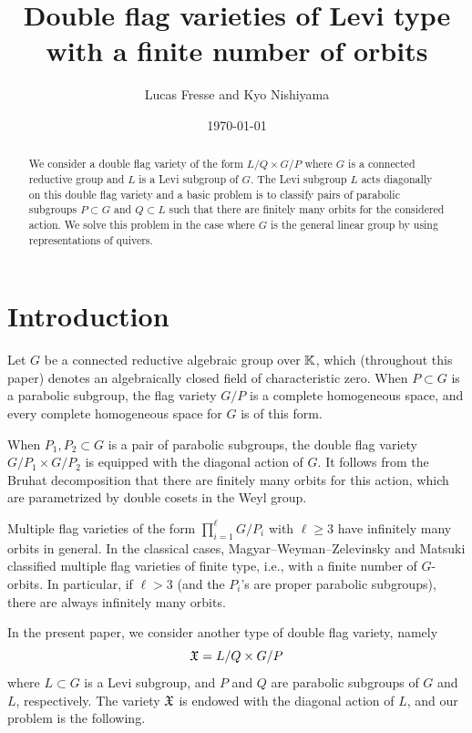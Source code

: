 \documentclass[12pt,reqno]{amsart}
\title{Double flag varieties of Levi type with a finite number of orbits}
\date{\today}
\author{Lucas Fresse and Kyo Nishiyama}
\begin{document}
\begin{abstract}
We consider a double flag variety of the form $L/Q\times G/P$ where $G$ is a connected reductive group and $L$ is a Levi subgroup of $G$.
The Levi subgroup $L$ acts diagonally on this double flag variety and a basic problem is to classify pairs of parabolic subgroups $P\subset G$ and $Q\subset L$ such that there are finitely many orbits for the considered action. We solve this problem in the case where $G$ is the general linear group by using representations of quivers.
\end{abstract}

\maketitle

\section{Introduction}

Let $G$ be a connected reductive algebraic group over $\mathbb{K}$, which (throughout this paper) denotes an algebraically closed field of characteristic zero.
When $P\subset G$ is a parabolic subgroup, the flag variety $G/P$ is a complete homogeneous space, and every complete homogeneous space for $G$ is of this form.

When $P_1,P_2\subset G$ is a pair of parabolic subgroups, the double flag variety $G/P_1\times G/P_2$ is equipped with the diagonal action of $G$. It follows from the Bruhat decomposition that there are finitely many orbits for this action, which are parametrized by double cosets in the Weyl group.

Multiple flag varieties of the form $\prod_{i=1}^\ell G/P_i$ with $\ell\geq 3$ have infinitely many orbits in general.
In the classical cases, Magyar--Weyman--Zelevinsky \cite{MWZ.1999,MWZ.2000} and
Matsuki \cite{Matsuki.2015,Matsuki.arXiv2019} classified multiple flag varieties of finite type, i.e., with a finite number of $G$-orbits. In particular, if $\ell>3$ (and the $P_i$'s are proper parabolic subgroups), there are always infinitely many orbits.

In the present paper, we consider another type of double flag variety, namely
%
\begin{equation*}
\mathfrak{X}=L/Q \times G/P
\end{equation*}
%
where $L\subset G$ is a Levi subgroup, and $P$ and $Q$ are parabolic subgroups of $G$ and $L$, respectively.
The variety $\mathfrak{X}$ is endowed with the diagonal action of $L$,
and our problem is the following.
\end{document}
